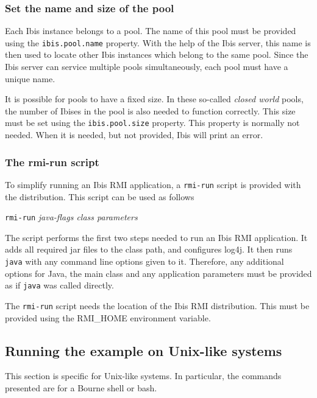 \documentclass[a4paper,10pt]{article}
\begin{document}
\subsubsection{Set the name and size of the pool}

Each Ibis instance belongs to a pool. The name of this pool must be provided
using the \texttt{ibis.pool.name} property. With the help of the Ibis server,
this name is then used to locate other Ibis instances which belong to the
same pool. Since the Ibis server can service multiple pools simultaneously,
each pool must have a unique name.

It is possible for pools to have a fixed size. In these so-called \emph{closed
world} pools, the number of Ibises in the pool is also needed to function
correctly. This size must be set using the \texttt{ibis.pool.size} property.
This property is normally not needed. When it is needed, but not provided, Ibis
will print an error. 

\subsubsection{The rmi-run script}

To simplify running an Ibis RMI application, a \texttt{rmi-run} script is
provided with the distribution. This script can be
used as follows

\begin{center}
\texttt{rmi-run} \emph{java-flags class parameters}
\end{center}

The script performs the first two steps needed to run an Ibis RMI application.
It adds all required jar files
to the class path, and configures log4j.
It then runs \texttt{java} with any
command line options given to it. Therefore, any additional options for
Java, the main class and any application parameters must be provided as
if \texttt{java} was called directly.

The \texttt{rmi-run} script needs the location of the Ibis RMI
distribution. This must be provided using the RMI\_HOME environment
variable.

\subsection{Running the example on Unix-like systems}

This section is specific for Unix-like systems. In particular, the
commands presented are for a Bourne shell or bash.
\end{document}
